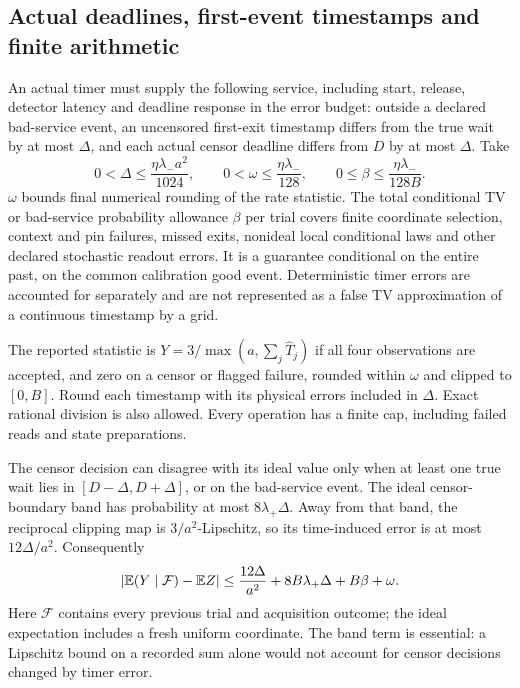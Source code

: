 \subsection{Actual deadlines, first-event timestamps and finite arithmetic}
An actual timer must supply the following service, including start,
release, detector latency and deadline response in the error budget:
outside a declared bad-service event, an uncensored first-exit timestamp
differs from the true wait by at most $\Delta$, and each actual censor
deadline differs from $D$ by at most $\Delta$. Take
\begin{equation}
 0<\Delta\le\frac{\eta\lambda_-a^2}{1024},\qquad
 0<\omega\le\frac{\eta\lambda_-}{128},\qquad
 0\le\beta\le\frac{\eta\lambda_-}{128B}.
 \label{ra:hardware}
\end{equation}
$\omega$ bounds final numerical rounding of the rate statistic. The
total conditional TV or bad-service probability allowance $\beta$ per
trial covers finite coordinate selection, context and pin failures,
missed exits, nonideal local conditional laws and other declared
stochastic readout errors. It is a guarantee conditional on the entire
past, on the common calibration good event. Deterministic timer errors
are accounted for separately and are not represented as a false TV
approximation of a continuous timestamp by a grid.

The reported statistic is
$Y=3/\max(a,\sum_j\widehat T_j)$ if all four observations are accepted,
and zero on a censor or flagged failure, rounded within $\omega$ and
clipped to $[0,B]$. Round each timestamp with its physical errors included
in $\Delta$. Exact rational division is also allowed. Every operation
has a finite cap, including failed reads and state preparations.

The censor decision can disagree with its ideal value only when at
least one true wait lies in $[D-\Delta,D+\Delta]$, or on the bad-service
event. The ideal censor-boundary band has probability at most
$8\lambda_+\Delta$. Away from that band, the reciprocal clipping map is
$3/a^2$-Lipschitz, so its time-induced error is at most $12\Delta/a^2$.
Consequently
\begin{equation}
 |\mathbb E(Y\mid\mathcal F)-\mathbb E Z|
 \le\frac{12\Delta}{a^2}+8B\lambda_+\Delta+B\beta+\omega.
 \label{ra:timerbias}
\end{equation}
Here $\mathcal F$ contains every previous trial and acquisition outcome;
the ideal expectation includes a fresh uniform coordinate.
The band term is essential: a Lipschitz bound on a recorded sum alone
would not account for censor decisions changed by timer error.

